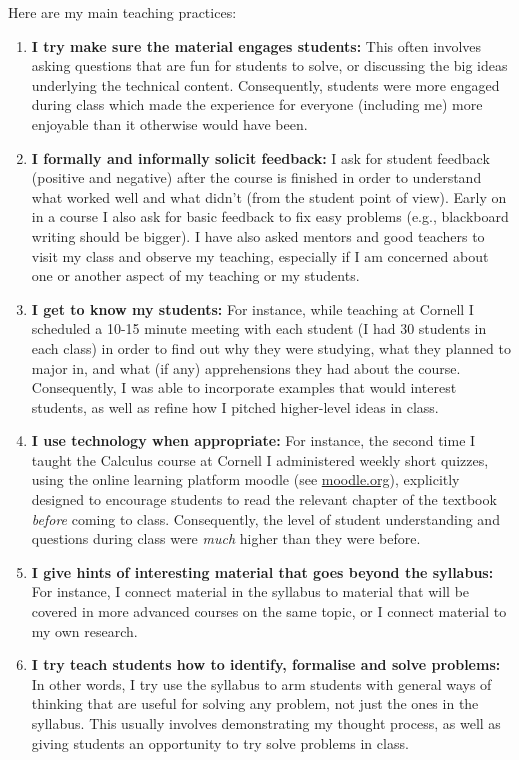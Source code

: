 \documentclass[10,a4paper,sans]{moderncv}
\begin{document}
Here are my main teaching practices:
\begin{enumerate}
 \item \textbf{I try make sure the material engages students:} This often involves asking questions that are fun for students to solve, or discussing the big ideas underlying the technical content. Consequently, students were more engaged during class which made the experience for everyone (including me) more enjoyable than it otherwise would have been. 
 
 \item \textbf{I formally and informally solicit feedback:} I ask for student feedback (positive and negative) after the course is finished in order to understand what worked well and what didn't (from the student point of view). Early on in a course I also ask for basic feedback to fix easy problems (e.g., blackboard writing should be bigger). I have also asked mentors and good teachers to visit my class and observe my teaching, especially if I am concerned about one or another aspect of my teaching or my students.
 
 \item \textbf{I get to know my students:} For instance, while teaching at Cornell I scheduled a 10-15 minute meeting with each student (I had 30 students in each class) in order to find out 
 why they were studying, what they planned to major in, and what (if any) apprehensions they had about the course. Consequently, I was able to incorporate examples that would interest students, 
 as well as refine how I pitched higher-level ideas in class.
 
 \item \textbf{I use technology when appropriate:} For instance, the second time I taught the Calculus course at Cornell I administered weekly short quizzes, using the online learning platform moodle (see \url{moodle.org}),   explicitly designed to encourage students to read the relevant chapter of the textbook \textit{before} coming to class. Consequently, the level of student understanding and questions during class were \textit{much} higher than they were before.
 
 \item \textbf{I give hints of interesting material that goes beyond the syllabus:} For instance, I connect material in the syllabus to material that will be covered in more advanced courses on the same topic, or I connect material to my own research.
 
 \item \textbf{I try teach students how to identify, formalise and solve problems:} In other words, I try use the syllabus to arm students with general ways of thinking that are useful for solving 
 any problem, not just the ones in the syllabus. This usually involves demonstrating my thought process, as well as giving students an opportunity to try solve problems in class. 
 

\end{enumerate}
\end{document}
